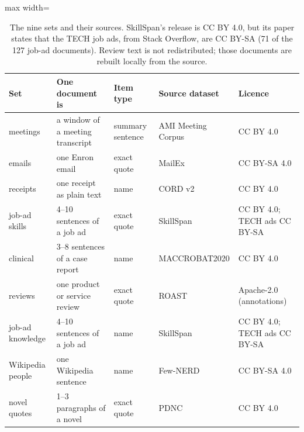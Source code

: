 \begin{table}[t]
  \centering
  \small
  \begin{adjustbox}{max width=\linewidth}
  \begin{tabular}{@{}lllll@{}}
    \toprule
    Set & One document is & Item type & Source dataset & Licence \\
    \midrule
    meetings & a window of a meeting transcript & summary sentence & AMI Meeting Corpus \citep{carletta2005ami} & CC BY 4.0 \\
    emails & one Enron email & exact quote & MailEx \citep{srivastava2023mailex} & CC BY-SA 4.0 \\
    receipts & one receipt as plain text & name & CORD v2 \citep{park2019cord} & CC BY 4.0 \\
    job-ad skills & 4--10 sentences of a job ad & exact quote & SkillSpan \citep{zhang2022skillspan} & CC BY 4.0; TECH ads CC BY-SA \\
    clinical & 3--8 sentences of a case report & name & MACCROBAT2020 \citep{caufield2019maccrobat} & CC BY 4.0 \\
    reviews & one product or service review & exact quote & ROAST \citep{roast} & Apache-2.0 (annotations) \\
    job-ad knowledge & 4--10 sentences of a job ad & name & SkillSpan & CC BY 4.0; TECH ads CC BY-SA \\
    Wikipedia people & one Wikipedia sentence & name & Few-NERD \citep{ding2021fewnerd} & CC BY-SA 4.0 \\
    novel quotes & 1--3 paragraphs of a novel & exact quote & PDNC \citep{vishnubhotla2022pdnc} & CC BY 4.0 \\
    \bottomrule
  \end{tabular}
  \end{adjustbox}
  \caption{The nine sets and their sources. SkillSpan's release is CC BY 4.0, but its paper states that the TECH job ads, from Stack Overflow, are CC BY-SA (71 of the 127 job-ad documents). Review text is not redistributed; those documents are rebuilt locally from the source.}
  \label{tab:licences}
\end{table}

